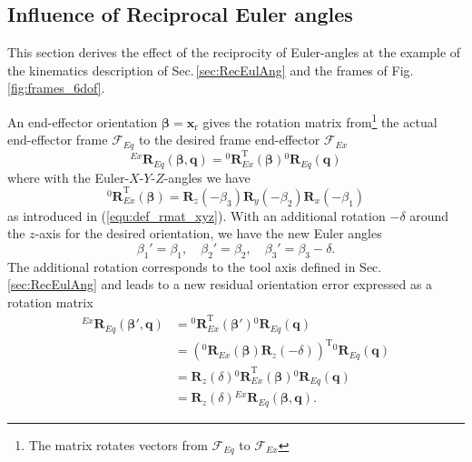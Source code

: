 \documentclass[twocolumn,10pt]{IFTOMM}
\newcommand{\bm}[1]{\boldsymbol{#1}}
\newcommand{\rotmat}[2]{{{ }^{#1}\boldsymbol{R}}_{#2}}
\newcommand{\transp}[0]{{\mathrm{T}}}
\newcommand{\ks}[1]{{\mathcal{F}}_{#1}}
\begin{document}
\subsection{Influence of Reciprocal Euler angles}
\label{sec:appendix_eulerreciproc}

This section derives the effect of the reciprocity of Euler-angles at the example of the kinematics description of Sec.\,\ref{sec:RecEulAng} and the frames of Fig.\,\ref{fig:frames_6dof}.

An end-effector orientation $\bm{\beta}=\bm{x}_{\mathrm{r}}$ gives the rotation matrix from\footnote{The matrix rotates vectors from $\ks{Eq}$ to $\ks{Ex}$} the actual end-effector frame $\ks{Eq}$ to the desired frame end-effector $\ks{Ex}$
%
\begin{equation}
\rotmat{Ex}{Eq}(\bm{\beta},\bm{q})
= 
\rotmat{0}{Ex}^\transp (\bm{\beta})\rotmat{0}{Eq}(\bm{q})
\label{equ:orierr_1_rotmat}
\end{equation}
%
where with the Euler-$X$-$Y$-$Z$-angles we have
%
\begin{equation}
\rotmat{0}{Ex}^\transp(\bm{\beta})
=
\bm{R}_z(-\beta_3) \bm{R}_y(-\beta_2) \bm{R}_x(-\beta_1)
\end{equation}
%
as introduced in (\ref{equ:def_rmat_xyz}).
With an additional rotation $-\delta$ around the $z$-axis for the desired orientation, we have the new Euler angles
%
\begin{equation}
\beta_1'=\beta_1,  \quad \beta_2'=\beta_2,  \quad \beta_3'=\beta_3-\delta.
\end{equation}
%
The additional rotation corresponds to the tool axis defined in Sec.\,\ref{sec:RecEulAng} %
and leads to a new residual orientation error expressed as a rotation matrix
%
\begin{align}
\rotmat{Ex}{Eq}(\bm{\beta}',\bm{q})
&=
\rotmat{0}{Ex}^\transp (\bm{\beta}') \rotmat{0}{Eq}(\bm{q}) \nonumber\\
&=
\left(\rotmat{0}{Ex}(\bm{\beta})\bm{R}_z(-\delta)\right)^\transp \rotmat{0}{Eq}(\bm{q}) \nonumber \\
&=
\bm{R}_z(\delta) \rotmat{0}{Ex}^\transp (\bm{\beta}) \rotmat{0}{Eq}(\bm{q}) \nonumber \\
&=
\bm{R}_z(\delta) \rotmat{Ex}{Eq}(\bm{\beta},\bm{q}).
\label{equ:orierr_2_rotmat}
\end{align}
\end{document}
